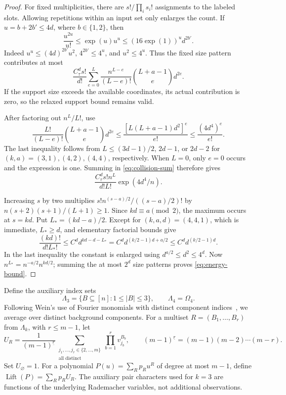 \documentclass[11pt]{article}
\DeclareMathOperator{\Lift}{Lift}
\begin{document}
\begin{proof}
For fixed multiplicities, there are \(s!/\prod_i s_i!\) assignments to the labeled slots.
Allowing repetitions within an input set only enlarges the count.
If \(u=b+2b'\le4d\), where \(b\in\{1,2\}\), then
\begin{equation}\label{eq:multiplicity-bound}
\frac{u^{2u}}{u!}\le \exp(u)u^u
\le(16\exp(1))^u d^{2b'}.
\end{equation}
Indeed \(u^u\le(4d)^{2b'}u^2\), \(4^{2b'}\le4^u\), and \(u^2\le4^u\).
Thus the fixed size pattern contributes at most
\begin{equation}\label{eq:collision-sum}
\frac{C_\tau^d s!}{d!}
\sum_{e=0}^{L}\frac{n^{L-e}}{(L-e)!}
\binom{L+a-1}{e}d^{2e}.
\end{equation}
If the support size exceeds the available coordinates, its actual contribution is zero, so the relaxed support bound remains valid.

After factoring out \(n^L/L!\), use
\begin{equation}\label{eq:collision-exponential}
\frac{L!}{(L-e)!}\binom{L+a-1}{e}d^{2e}
\le\frac{[L(L+a-1)d^2]^e}{e!}
\le\frac{(4d^4)^e}{e!}.
\end{equation}
The last inequality follows from \(L\le(3d-1)/2\), \(2d-1\), or \(2d-2\) for \((k,a)=(3,1),(4,2),(4,4)\), respectively.
When \(L=0\), only \(e=0\) occurs and the expression is one.
Summing in \eqref{eq:collision-sum} therefore gives
\begin{equation}\label{eq:fixed-size-bound}
\frac{C_\tau^d s!n^L}{d!L!}\exp(4d^4/n).
\end{equation}

Increasing \(s\) by two multiplies \(s!n^{(s-a)/2}/((s-a)/2)!\) by
\(n(s+2)(s+1)/(L+1)\ge1\).
Since \(kd\equiv a\pmod2\), the maximum occurs at \(s=kd\).
Put \(L_*=(kd-a)/2\).
Except for \((k,a,d)=(4,4,1)\), which is immediate, \(L_*\ge d\), and elementary factorial bounds give
\[
\frac{(kd)!}{d!L_*!}
\le C^d d^{kd-d-L_*}
=C^d d^{(k/2-1)d+a/2}
\le C^d d^{(k/2-1)d}.
\]
In the last inequality the constant is enlarged using \(d^{a/2}\le d^2\le4^d\).
Now \(n^{L_*}=n^{-a/2}n^{kd/2}\); summing the at most \(2^d\) size patterns proves \eqref{eq:energy-bound}.
\end{proof}

Define the auxiliary index sets
\[
\Lambda_3=\{B\subseteq[n]:1\le|B|\le3\},
\qquad
\Lambda_4=\Omega_4.
\]
Following Wein's use of Fourier monomials with distinct component indices~\cite[Section~3.4]{Wein2023}, we average over distinct background components.
For a multiset \(R=(B_1,\ldots,B_r)\) from \(\Lambda_k\), with \(r\le m-1\), let
\begin{equation}\label{eq:fourier-witnesses}
U_R=\frac1{(m-1)^{\underline r}}
\sum_{\substack{j_1,\ldots,j_r\in\{2,\ldots,m\}\\\text{all distinct}}}
\prod_{b=1}^r v_{j_b}^{B_b},
\qquad
(m-1)^{\underline r}=(m-1)(m-2)\cdots(m-r).
\end{equation}
Set \(U_\varnothing=1\).
For a polynomial \(P(u)=\sum_Rp_Ru^R\) of degree at most \(m-1\), define
\(\Lift(P)=\sum_Rp_RU_R\).
The auxiliary pair characters used for \(k=3\) are functions of the underlying Rademacher variables, not additional observations.
\end{document}
